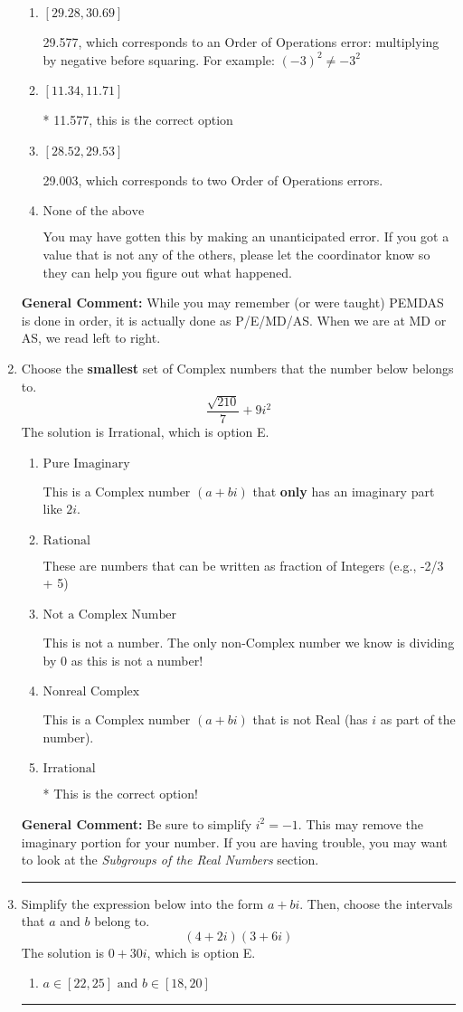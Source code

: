\documentclass{extbook}[14pt]
\newcommand{\litem}[1]{\item #1

\rule{\textwidth}{0.4pt}}
\begin{document}
\begin{enumerate}
{\begin{enumerate}[label=\Alph*.]
 11.003, which corresponds to an Order of Operations error: not reading left-to-right for multiplication/division.
\item \( [29.28, 30.69] \)

 29.577, which corresponds to an Order of Operations error: multiplying by negative before squaring. For example: $(-3)^2 \neq -3^2$
\item \( [11.34, 11.71] \)

* 11.577, this is the correct option
\item \( [28.52, 29.53] \)

 29.003, which corresponds to two Order of Operations errors.
\item \( \text{None of the above} \)

 You may have gotten this by making an unanticipated error. If you got a value that is not any of the others, please let the coordinator know so they can help you figure out what happened.
\end{enumerate}

\textbf{General Comment:} While you may remember (or were taught) PEMDAS is done in order, it is actually done as P/E/MD/AS. When we are at MD or AS, we read left to right.
}
\litem{
Choose the \textbf{smallest} set of Complex numbers that the number below belongs to.
\[ \frac{\sqrt{210}}{7}+9i^2 \]The solution is \( \text{Irrational} \), which is option E.\begin{enumerate}[label=\Alph*.]
\item \( \text{Pure Imaginary} \)

This is a Complex number $(a+bi)$ that \textbf{only} has an imaginary part like $2i$.
\item \( \text{Rational} \)

These are numbers that can be written as fraction of Integers (e.g., -2/3 + 5)
\item \( \text{Not a Complex Number} \)

This is not a number. The only non-Complex number we know is dividing by 0 as this is not a number!
\item \( \text{Nonreal Complex} \)

This is a Complex number $(a+bi)$ that is not Real (has $i$ as part of the number).
\item \( \text{Irrational} \)

* This is the correct option!
\end{enumerate}

\textbf{General Comment:} Be sure to simplify $i^2 = -1$. This may remove the imaginary portion for your number. If you are having trouble, you may want to look at the \textit{Subgroups of the Real Numbers} section.
}
\litem{
Simplify the expression below into the form $a+bi$. Then, choose the intervals that $a$ and $b$ belong to.
\[ (4 + 2 i)(3 + 6 i) \]The solution is \( 0 + 30 i \), which is option E.\begin{enumerate}[label=\Alph*.]
\item \( a \in [22, 25] \text{ and } b \in [18, 20] \)


\end{enumerate}}
\end{enumerate}
\end{document}
